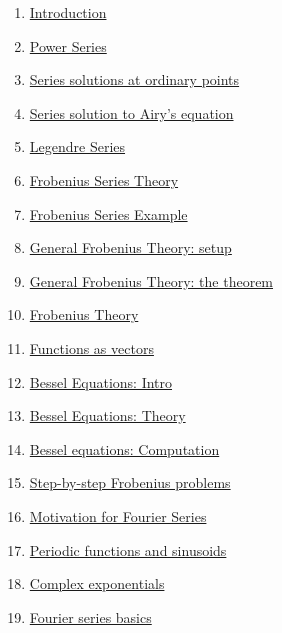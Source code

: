 \documentclass[11pt]{article}
\begin{document}
\begin{multicols}{2}
	\begin{enumerate}
		\item \href{https://mp.weixin.qq.com/s/Uf606JDKYdJcDkHvcveJiQ}{Introduction}	%
		\item \href{https://mp.weixin.qq.com/s/TDNihSu3BtIjxk8MELDkXA}{Power Series}	%
		\item \href{https://mp.weixin.qq.com/s/Bxml8oARwAwU1hS31BzPDg}{Series solutions at ordinary points}	%
		\item \href{https://mp.weixin.qq.com/s/Qnh2eIlW9AyydxDNuWNLxg}{Series solution to Airy's equation}	%
		\item \href{https://mp.weixin.qq.com/s/VrTQFsBZZFrOCRDP6_x1uA}{Legendre Series}	%
		\item \href{https://mp.weixin.qq.com/s/XPpoT0WRNJ2GmwFzs3qEqQ}{Frobenius Series Theory}	%
		\item \href{https://mp.weixin.qq.com/s/Ak9E1PXj5OTsnhpTdAa_5Q}{Frobenius Series Example}	%
		\item \href{https://mp.weixin.qq.com/s/W4gkd5gbLpoHyXZoC18mLg}{General Frobenius Theory: setup}	%
		\item \href{https://mp.weixin.qq.com/s/1v4Y7I1oXMMTe6ooT9FFBA}{General Frobenius Theory: the theorem}	%
		\item \href{https://mp.weixin.qq.com/s/z49fkohhvOxYWsZNZ5Gydg}{Frobenius Theory}	%
		\item \href{https://mp.weixin.qq.com/s/TFdIvl4V11kRo0ldpUtQpQ}{Functions as vectors}	%
		\item \href{https://mp.weixin.qq.com/s/naFfK_ZgUXKJPobs7H0ClQ}{Bessel Equations: Intro}	%
		\item \href{https://mp.weixin.qq.com/s/RLMqDnssdC0A16aEI42j-g}{Bessel Equations: Theory}	%
		\item \href{https://mp.weixin.qq.com/s/u09umqmuG5Q99rrE9Gnz5Q}{Bessel equations: Computation}	%
		\item \href{https://mp.weixin.qq.com/s/JvcaWArZ43A-YERmrjYKqQ}{Step-by-step Frobenius problems}	%
		\item \href{https://mp.weixin.qq.com/s/7kMPU6bc72E_ygDPXu_SCA}{Motivation for Fourier Series}	%
		\item \href{https://mp.weixin.qq.com/s/wOl-zx-v6GRlvUbznFwZig}{Periodic functions and sinusoids}	%
		\item \href{https://mp.weixin.qq.com/s/e6IXGNPHxJS_8ooUBptbtg}{Complex exponentials}	%
		\item \href{https://mp.weixin.qq.com/s/zLvtXfOTtr7ltZgJ2LEl1w}{Fourier series basics}	%

\end{enumerate}
\end{multicols}
\end{document}
